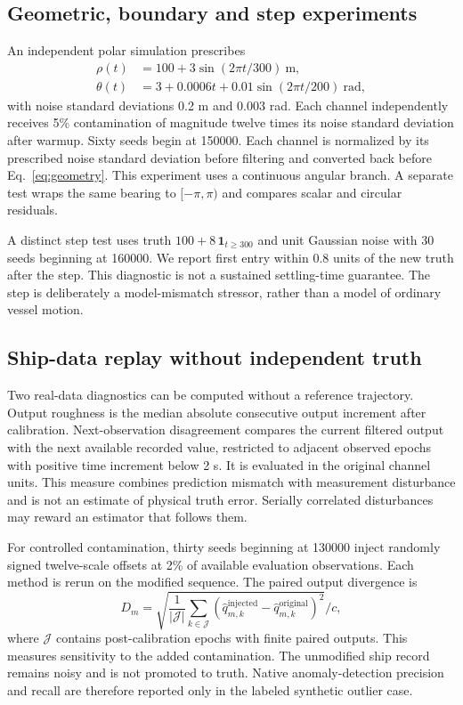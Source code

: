 \documentclass[12pt,a4paper]{article}
\begin{document}
\subsection{Geometric, boundary and step experiments}
An independent polar simulation prescribes
\begin{align}
 \rho(t)&=100+3\sin(2\pi t/300)~\mathrm{m},\\
 \theta(t)&=3+0.0006t+0.01\sin(2\pi t/200)~\mathrm{rad},
\end{align}
with noise standard deviations 0.2 m and 0.003 rad. Each channel independently receives 5\% contamination of magnitude twelve times its noise standard deviation after warmup. Sixty seeds begin at 150000. Each channel is normalized by its prescribed noise standard deviation before filtering and converted back before Eq.~\eqref{eq:geometry}. This experiment uses a continuous angular branch. A separate test wraps the same bearing to $[-\pi,\pi)$ and compares scalar and circular residuals.

A distinct step test uses truth $100+8\,\mathbf1_{t\ge300}$ and unit Gaussian noise with 30 seeds beginning at 160000. We report first entry within 0.8 units of the new truth after the step. This diagnostic is not a sustained settling-time guarantee. The step is deliberately a model-mismatch stressor, rather than a model of ordinary vessel motion.

\subsection{Ship-data replay without independent truth}
Two real-data diagnostics can be computed without a reference trajectory. Output roughness is the median absolute consecutive output increment after calibration. Next-observation disagreement compares the current filtered output with the next available recorded value, restricted to adjacent observed epochs with positive time increment below 2 s. It is evaluated in the original channel units. This measure combines prediction mismatch with measurement disturbance and is not an estimate of physical truth error. Serially correlated disturbances may reward an estimator that follows them.

For controlled contamination, thirty seeds beginning at 130000 inject randomly signed twelve-scale offsets at 2\% of available evaluation observations. Each method is rerun on the modified sequence. The paired output divergence is
\begin{equation}
 D_m=\sqrt{\frac{1}{|\mathcal J|}\sum_{k\in\mathcal J}
  (\hat q_{m,k}^{\mathrm{injected}}-\hat q_{m,k}^{\mathrm{original}})^2}/c,
 \label{eq:divergence}
\end{equation}
where $\mathcal J$ contains post-calibration epochs with finite paired outputs. This measures sensitivity to the added contamination. The unmodified ship record remains noisy and is not promoted to truth. Native anomaly-detection precision and recall are therefore reported only in the labeled synthetic outlier case.
\end{document}
